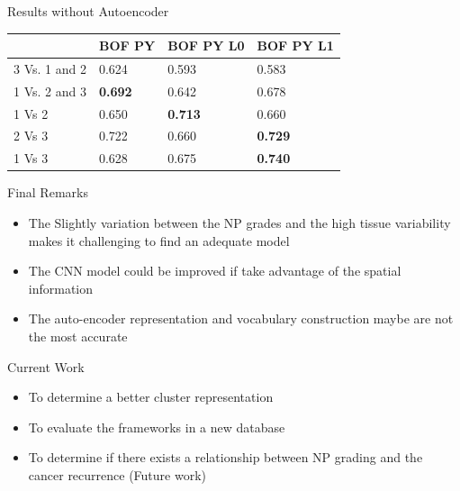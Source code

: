 \documentclass[usenames,dvipsnames]{beamer}
\begin{document}
\begin{frame}{Results without Autoencoder}

\begin{table}
\begin{tabular}{|l|l|l|l|}
\hline
              & BOF PY                          & BOF PY L0                       & BOF PY L1                       \\ \hline
3 Vs. 1 and 2 & 0.624                           & 0.593                           & 0.583                           \\ \hline
1 Vs. 2 and 3 & \textbf{0.692} & 0.642                           & 0.678                           \\ \hline
1 Vs 2        & 0.650                           & \textbf{0.713} & 0.660                           \\ \hline
2 Vs 3        & 0.722                           & 0.660                           & \textbf{0.729} \\ \hline
1 Vs 3        & 0.628                           & 0.675                           & \textbf{0.740} \\ \hline
\end{tabular}
\end{table}


\end{frame}


\begin{frame}{Final Remarks}

\begin{itemize}
    \item The Slightly variation between the NP grades and the high tissue variability makes it challenging to find an adequate model
    \item The CNN model could be improved if take advantage of the spatial information
    \item The auto-encoder representation and vocabulary construction maybe are not the most accurate
\end{itemize}
    
\end{frame}

\begin{frame}{Current Work}

\begin{itemize}
  \item To determine a better cluster representation 
  
  \item To evaluate the frameworks in a new database
  
  \item To determine if there exists a relationship between NP grading and the cancer recurrence (Future work)
\end{itemize}

\end{frame}
\end{document}
